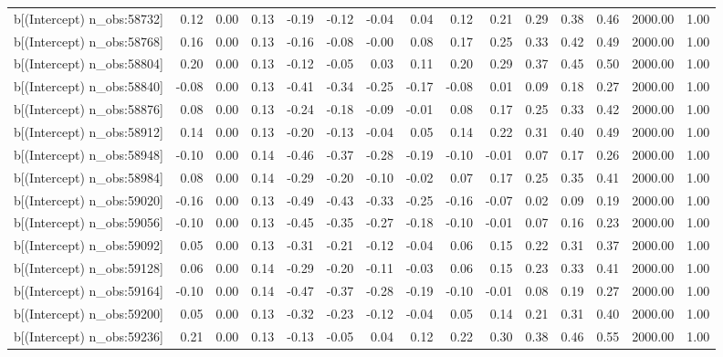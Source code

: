 \begin{table}[ht]
\begin{tabular}{rrrrrrrrrrrrrrr}
  b[(Intercept) n\_obs:58732] & 0.12 & 0.00 & 0.13 & -0.19 & -0.12 & -0.04 & 0.04 & 0.12 & 0.21 & 0.29 & 0.38 & 0.46 & 2000.00 & 1.00 \\ 
  b[(Intercept) n\_obs:58768] & 0.16 & 0.00 & 0.13 & -0.16 & -0.08 & -0.00 & 0.08 & 0.17 & 0.25 & 0.33 & 0.42 & 0.49 & 2000.00 & 1.00 \\ 
  b[(Intercept) n\_obs:58804] & 0.20 & 0.00 & 0.13 & -0.12 & -0.05 & 0.03 & 0.11 & 0.20 & 0.29 & 0.37 & 0.45 & 0.50 & 2000.00 & 1.00 \\ 
  b[(Intercept) n\_obs:58840] & -0.08 & 0.00 & 0.13 & -0.41 & -0.34 & -0.25 & -0.17 & -0.08 & 0.01 & 0.09 & 0.18 & 0.27 & 2000.00 & 1.00 \\ 
  b[(Intercept) n\_obs:58876] & 0.08 & 0.00 & 0.13 & -0.24 & -0.18 & -0.09 & -0.01 & 0.08 & 0.17 & 0.25 & 0.33 & 0.42 & 2000.00 & 1.00 \\ 
  b[(Intercept) n\_obs:58912] & 0.14 & 0.00 & 0.13 & -0.20 & -0.13 & -0.04 & 0.05 & 0.14 & 0.22 & 0.31 & 0.40 & 0.49 & 2000.00 & 1.00 \\ 
  b[(Intercept) n\_obs:58948] & -0.10 & 0.00 & 0.14 & -0.46 & -0.37 & -0.28 & -0.19 & -0.10 & -0.01 & 0.07 & 0.17 & 0.26 & 2000.00 & 1.00 \\ 
  b[(Intercept) n\_obs:58984] & 0.08 & 0.00 & 0.14 & -0.29 & -0.20 & -0.10 & -0.02 & 0.07 & 0.17 & 0.25 & 0.35 & 0.41 & 2000.00 & 1.00 \\ 
  b[(Intercept) n\_obs:59020] & -0.16 & 0.00 & 0.13 & -0.49 & -0.43 & -0.33 & -0.25 & -0.16 & -0.07 & 0.02 & 0.09 & 0.19 & 2000.00 & 1.00 \\ 
  b[(Intercept) n\_obs:59056] & -0.10 & 0.00 & 0.13 & -0.45 & -0.35 & -0.27 & -0.18 & -0.10 & -0.01 & 0.07 & 0.16 & 0.23 & 2000.00 & 1.00 \\ 
  b[(Intercept) n\_obs:59092] & 0.05 & 0.00 & 0.13 & -0.31 & -0.21 & -0.12 & -0.04 & 0.06 & 0.15 & 0.22 & 0.31 & 0.37 & 2000.00 & 1.00 \\ 
  b[(Intercept) n\_obs:59128] & 0.06 & 0.00 & 0.14 & -0.29 & -0.20 & -0.11 & -0.03 & 0.06 & 0.15 & 0.23 & 0.33 & 0.41 & 2000.00 & 1.00 \\ 
  b[(Intercept) n\_obs:59164] & -0.10 & 0.00 & 0.14 & -0.47 & -0.37 & -0.28 & -0.19 & -0.10 & -0.01 & 0.08 & 0.19 & 0.27 & 2000.00 & 1.00 \\ 
  b[(Intercept) n\_obs:59200] & 0.05 & 0.00 & 0.13 & -0.32 & -0.23 & -0.12 & -0.04 & 0.05 & 0.14 & 0.21 & 0.31 & 0.40 & 2000.00 & 1.00 \\ 
  b[(Intercept) n\_obs:59236] & 0.21 & 0.00 & 0.13 & -0.13 & -0.05 & 0.04 & 0.12 & 0.22 & 0.30 & 0.38 & 0.46 & 0.55 & 2000.00 & 1.00 \\ 

\end{tabular}
\end{table}

